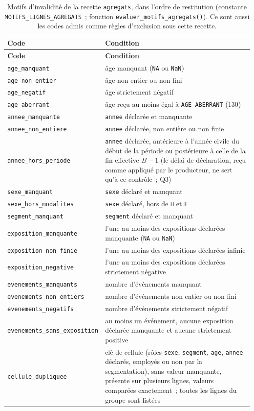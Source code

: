 \documentclass[a4paper,11pt]{article}
\newcommand{\code}[1]{\texttt{\small #1}}
\begin{document}
{\small
{}
\begin{longtable}{@{}p{4.9cm}p{9.7cm}@{}}
\caption{Motifs d'invalidité de la recette \code{agregats}, dans l'ordre de
restitution (constante \code{MOTIFS\_LIGNES\_AGREGATS}~; fonction
\code{evaluer\_motifs\_agregats()}). Ce sont aussi les codes admis comme
règles d'exclusion sous cette recette.}
\label{tab:motifs-agregats}\\
\rowcolor{tableheader}
\textcolor{financeblue}{\textbf{Code}} &
\textcolor{financeblue}{\textbf{Condition}} \\
\endfirsthead
\rowcolor{tableheader}
\textcolor{financeblue}{\textbf{Code}} &
\textcolor{financeblue}{\textbf{Condition}} \\
\endhead
\code{age\_manquant} & âge manquant (\code{NA} ou \code{NaN}) \\
\code{age\_non\_entier} & âge non entier ou non fini \\
\code{age\_negatif} & âge strictement négatif \\
\code{age\_aberrant} & âge reçu au moins égal à \code{AGE\_ABERRANT} (130) \\
\code{annee\_manquante} & \code{annee} déclarée et manquante \\
\code{annee\_non\_entiere} & \code{annee} déclarée, non entière ou non finie \\
\code{annee\_hors\_periode} & \code{annee} déclarée, antérieure à l'année civile du début de la période ou postérieure à celle de la fin effective $B - 1$ (le délai de déclaration, reçu comme appliqué par le producteur, ne sert qu'à ce contrôle~; Q3) \\
\code{sexe\_manquant} & \code{sexe} déclaré et manquant \\
\code{sexe\_hors\_modalites} & \code{sexe} déclaré, hors de \code{H} et \code{F} \\
\code{segment\_manquant} & \code{segment} déclaré et manquant \\
\code{exposition\_manquante} & l'une au moins des expositions déclarées manquante (\code{NA} ou \code{NaN}) \\
\code{exposition\_non\_finie} & l'une au moins des expositions déclarées infinie \\
\code{exposition\_negative} & l'une au moins des expositions déclarées strictement négative \\
\code{evenements\_manquants} & nombre d'événements manquant \\
\code{evenements\_non\_entiers} & nombre d'événements non entier ou non fini \\
\code{evenements\_negatifs} & nombre d'événements strictement négatif \\
\code{evenements\_sans\_exposition} & au moins un événement, aucune exposition déclarée manquante et aucune strictement positive \\
\code{cellule\_dupliquee} & clé de cellule (rôles \code{sexe}, \code{segment}, \code{age}, \code{annee} déclarés, employés ou non par la segmentation), sans valeur manquante, présente sur plusieurs lignes, valeurs comparées exactement~; toutes les lignes du groupe sont listées \\
\end{longtable}
}
\end{document}

